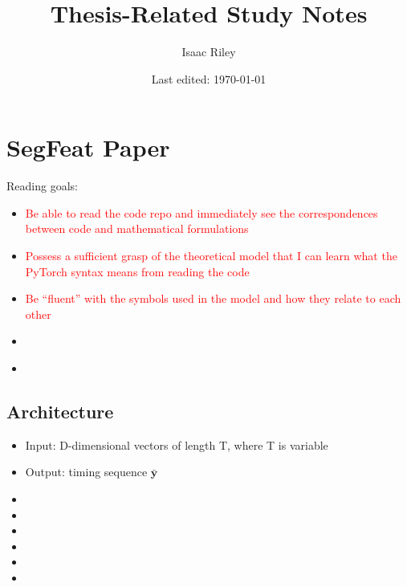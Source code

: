 \documentclass[a4paper]{article}
\title{Thesis-Related Study Notes}
\author{Isaac Riley}
\date{Last edited: \today}
\newcommand{\followup}[1]{\textcolor{red}{ #1 }}
\begin{document}
\maketitle
\tableofcontents
\newpage


\section{SegFeat Paper}
Reading goals:
\begin{itemize}
    \item \followup{Be able to read the code repo and immediately see the correspondences between code and mathematical formulations}
    \item \followup{Possess a sufficient grasp of the theoretical model that I can learn what the PyTorch syntax means from reading the code}
    \item \followup{Be ``fluent'' with the symbols used in the model and how they relate to each other}
    \item \followup{}
    \item \followup{}
\end{itemize}
\subsection{Architecture}
\begin{itemize}
    \item Input: D-dimensional vectors of length T, where T is variable
    \item Output: timing sequence $\bar{\textbf{y}}$
    \item
    \item
    \item
    \item
    \item
    \item
\end{itemize}
\subsection{}

\subsection{}
\end{document}
